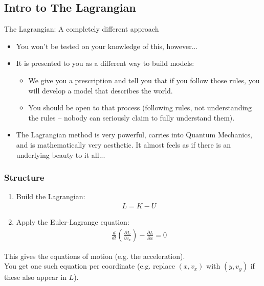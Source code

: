 \documentclass[aspectratio=169,
hyperref={colorlinks,urlcolor=blue}
]{beamer}
\begin{document}
\subsection{Intro to The Lagrangian}
\label{subsec:introtothelagrangian}
\begin{frame}{The Lagrangian: A completely different approach}
\begin{itemize}
\item You won’t be tested on your knowledge of this, however...
\item It is presented to you as a different way to build models:
\begin{itemize}
\item We give you a prescription and tell you that if you follow those rules, you will develop a model that describes the world.
\item You should be open to that process (following rules, not understanding the rules – nobody can seriously claim to fully understand them).
\end{itemize}

\item The Lagrangian method is very powerful, carries into Quantum Mechanics, and is mathematically very aesthetic. It almost feels as if there is an underlying beauty to it all...
\end{itemize}
\end{frame}


\subsubsection{Structure}
\label{subsubsec:structurelagrangian}
{
\begin{enumerate}
\item Build the Lagrangian:
\begin{align*}
L=K-U
\end{align*}
\item Apply the Euler-Lagrange equation:
\begin{align*}
\frac{d}{dt}\left( \frac{\partial L}{\partial v_x} \right) - \frac{\partial L}{\partial x} =0
\end{align*}
\end{enumerate}
This gives the equations of motion (e.g. the acceleration).\\
You get one such equation per coordinate (e.g. replace $(x,v_x)$ with $(y, v_y)$ if these also appear in $L$).
}
{

}
\end{document}
